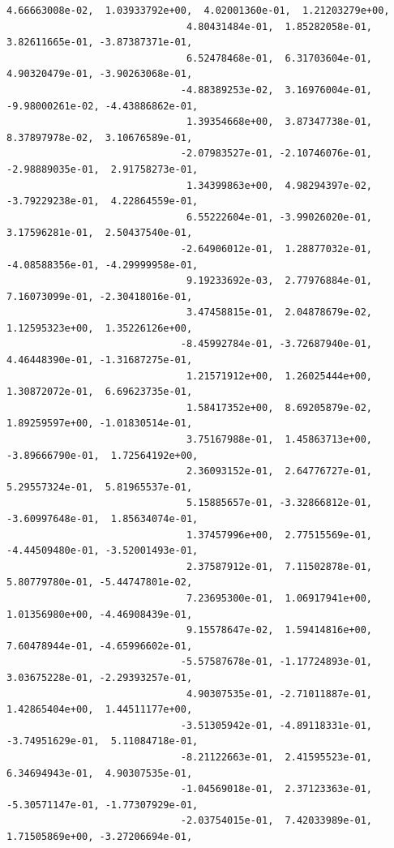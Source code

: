 \documentclass[11pt]{article}
\begin{document}
\begin{Verbatim}[commandchars=\\\{\}]
                               4.66663008e-02,  1.03933792e+00,  4.02001360e-01,  1.21203279e+00,
                               4.80431484e-01,  1.85282058e-01,  3.82611665e-01, -3.87387371e-01,
                               6.52478468e-01,  6.31703604e-01,  4.90320479e-01, -3.90263068e-01,
                              -4.88389253e-02,  3.16976004e-01, -9.98000261e-02, -4.43886862e-01,
                               1.39354668e+00,  3.87347738e-01,  8.37897978e-02,  3.10676589e-01,
                              -2.07983527e-01, -2.10746076e-01, -2.98889035e-01,  2.91758273e-01,
                               1.34399863e+00,  4.98294397e-02, -3.79229238e-01,  4.22864559e-01,
                               6.55222604e-01, -3.99026020e-01,  3.17596281e-01,  2.50437540e-01,
                              -2.64906012e-01,  1.28877032e-01, -4.08588356e-01, -4.29999958e-01,
                               9.19233692e-03,  2.77976884e-01,  7.16073099e-01, -2.30418016e-01,
                               3.47458815e-01,  2.04878679e-02,  1.12595323e+00,  1.35226126e+00,
                              -8.45992784e-01, -3.72687940e-01,  4.46448390e-01, -1.31687275e-01,
                               1.21571912e+00,  1.26025444e+00,  1.30872072e-01,  6.69623735e-01,
                               1.58417352e+00,  8.69205879e-02,  1.89259597e+00, -1.01830514e-01,
                               3.75167988e-01,  1.45863713e+00, -3.89666790e-01,  1.72564192e+00,
                               2.36093152e-01,  2.64776727e-01,  5.29557324e-01,  5.81965537e-01,
                               5.15885657e-01, -3.32866812e-01, -3.60997648e-01,  1.85634074e-01,
                               1.37457996e+00,  2.77515569e-01, -4.44509480e-01, -3.52001493e-01,
                               2.37587912e-01,  7.11502878e-01,  5.80779780e-01, -5.44747801e-02,
                               7.23695300e-01,  1.06917941e+00,  1.01356980e+00, -4.46908439e-01,
                               9.15578647e-02,  1.59414816e+00,  7.60478944e-01, -4.65996602e-01,
                              -5.57587678e-01, -1.17724893e-01,  3.03675228e-01, -2.29393257e-01,
                               4.90307535e-01, -2.71011887e-01,  1.42865404e+00,  1.44511177e+00,
                              -3.51305942e-01, -4.89118331e-01, -3.74951629e-01,  5.11084718e-01,
                              -8.21122663e-01,  2.41595523e-01,  6.34694943e-01,  4.90307535e-01,
                              -1.04569018e-01,  2.37123363e-01, -5.30571147e-01, -1.77307929e-01,
                              -2.03754015e-01,  7.42033989e-01,  1.71505869e+00, -3.27206694e-01,

\end{Verbatim}
\end{document}
